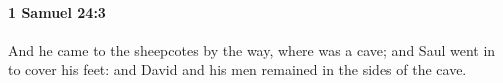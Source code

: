 
		\paragraph{1 Samuel 24:3} %
			\label{1SAMUEL-24-3}

			And he came to the sheepcotes by the way, where was a cave; and Saul went in to cover his feet: and David and his men remained in the sides of the cave.


